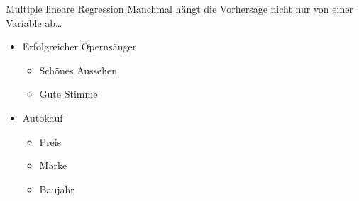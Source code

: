 \begin{frame}{Multiple lineare Regression}
    Manchmal hängt die Vorhersage nicht nur von einer Variable ab\dots
    \begin{itemize}[<+->]
        \item Erfolgreicher Opernsänger 
              \begin{itemize}
                  \item Schönes Aussehen 
                  \item Gute Stimme 
              \end{itemize}
        \item Autokauf 
              \begin{itemize}
                  \item Preis 
                  \item Marke 
                  \item Baujahr 
              \end{itemize}
    \end{itemize}

\end{frame}

